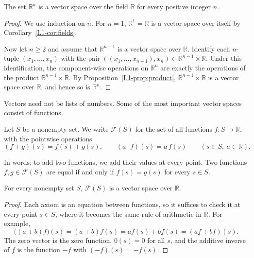 \begin{corollary}
    The set $\mathbb{R}^n$ is a vector space over the field $\mathbb{R}$ for every positive integer $n$.
\end{corollary}

\begin{proof}
    We use induction on $n$. For $n = 1$, $\mathbb{R}^1 = \mathbb{R}$ is a vector space over itself by Corollary~\ref{L1-cor:fields}.

    Now let $n \geq 2$ and assume that $\mathbb{R}^{n-1}$ is a vector space over $\mathbb{R}$. Identify each $n$-tuple $(x_1, \ldots, x_n)$ with the pair $((x_1, \ldots, x_{n-1}), x_n) \in \mathbb{R}^{n-1} \times \mathbb{R}$. Under this identification, the component-wise operations on $\mathbb{R}^n$ are exactly the operations of the product $\mathbb{R}^{n-1} \times \mathbb{R}$. By Proposition~\ref{L1-prop:product}, $\mathbb{R}^{n-1} \times \mathbb{R}$ is a vector space over $\mathbb{R}$, and hence so is $\mathbb{R}^n$.
\end{proof}

Vectors need not be lists of numbers. Some of the most important vector spaces consist of functions.

\begin{definition}\label{L1-def:function-space}
    Let $S$ be a nonempty set. We write $\mathcal{F}(S)$ for the set of all functions $f: S \to \mathbb{R}$, with the pointwise operations
    \[(f + g)(s) = f(s) + g(s), \qquad (a \cdot f)(s) = a\, f(s) \qquad (s \in S, \ a \in \mathbb{R}).\]
\end{definition}

In words: to add two functions, we add their values at every point. Two functions $f, g \in \mathcal{F}(S)$ are equal if and only if $f(s) = g(s)$ for every $s \in S$.

\begin{proposition}\label{L1-prop:function-space}
    For every nonempty set $S$, $\mathcal{F}(S)$ is a vector space over $\mathbb{R}$.
\end{proposition}

\begin{proof}
    Each axiom is an equation between functions, so it suffices to check it at every point $s \in S$, where it becomes the same rule of arithmetic in $\mathbb{R}$. For example,
    \[\big((a + b)f\big)(s) = (a + b)f(s) = af(s) + bf(s) = (af + bf)(s).\]
    The zero vector is the zero function, $0(s) = 0$ for all $s$, and the additive inverse of $f$ is the function $-f$ with $(-f)(s) = -f(s)$.
\end{proof}

